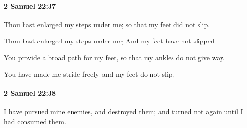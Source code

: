 		\paragraph{2 Samuel 22:37} %
			\label{2SAMUEL-22-37}

			Thou hast enlarged my steps under me; so that my feet did not slip.

			\begin{versebox}
					\item[BHS] 
					\item[ASV] Thou hast enlarged my steps under me; And my feet have not slipped.
					\item[NIV] You provide a broad path for my feet, so that my ankles do not give way.
					\item[NRSV] You have made me stride freely, and my feet do not slip;
			\end{versebox}

		\paragraph{2 Samuel 22:38} %
			\label{2SAMUEL-22-38}

			I have pursued mine enemies, and destroyed them; and turned not again until I had consumed them.

